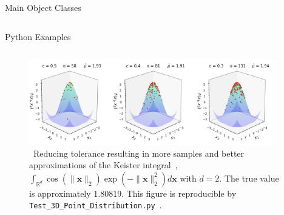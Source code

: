 \documentclass[final]{beamer}
\newlength{\onecolwid}
\newlength{\twocolwid}
\newlength{\threecolwid}
\newcommand{\bvec}[1]{\boldsymbol{#1}}
\newcommand{\vx}{\bvec{x}}
\begin{document}
\begin{frame}[t]
\begin{columns}[t]
\begin{column}{\threecolwid}
\begin{columns}[t,totalwidth=\threecolwid]
\begin{column}{\twocolwid}
\begin{block}{Main Object Classes}
\end{block}
\end{column}

\end{columns} 

\begin{column}{\threecolwid}\vspace{-0.8in}
\begin{block}{Python Examples}
    \begin{column}{\twocolwid}
        \begin{figure} 
            \includegraphics[width=0.96\textwidth]{Images/Three_3d_SurfaceScatters.png}         
            \caption{\ Reducing tolerance resulting in more samples and better approximations of the Keister integral~\cite{keister1996multidimensional}, $\int_{\mathbb{R}^d} \cos(\lVert \vx \rVert_2) \exp(-\lVert \vx \rVert_2^2)d\vx$  with $d=2$. The true value is approximately 1.80819. This figure is reproducible by \texttt{Test\_3D\_Point\_Distribution.py}~\cite{HicEtal19}.}  \label{fig3d}
        \end{figure} 
    \end{column}
    \begin{column}{\onecolwid}
        
    \end{column}

\end{block}
\end{column}

\end{column}


\end{columns}
\end{frame}
\end{document}
